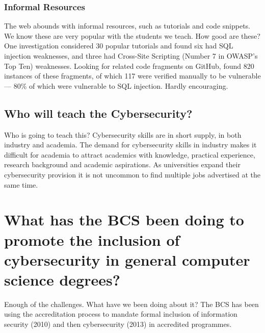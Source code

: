 \documentclass[a4paper,11pt]{article}
\begin{document}
\subsubsection*{Informal Resources}\label{sec:informal}
The web abounds with informal resources, such as tutorials and code snippets. We know these are very popular with the students we teach. How good are these? One investigation \cite{Unruhetal2017a} considered 30 popular tutorials and found six had SQL injection weaknesses, and three had Cross-Site Scripting (Number 7 in OWASP's Top Ten) weaknesses. Looking for related code fragments on GitHub, found 820 instances of these fragments, of which 117 were verified manually to be vulnerable --- 80\% of which were vulnerable to SQL injection. Hardly encouraging.


\subsection*{Who will teach the Cybersecurity?}\label{sec:staffing}
Who is going to teach this? Cybersecurity skills are in short supply, in both industry and academia. The demand for cybersecurity skills in industry makes it difficult for academia to attract academics with knowledge, practical experience, research background and academic aspirations. As universities expand their cybersecurity provision it is not uncommon to find multiple jobs advertised at the same time. 



\section*{What has the BCS been doing to promote the inclusion of cybersecurity in general computer science degrees? }

Enough of the challenges. What have we been doing about it? The BCS has been using the accreditation process to mandate formal inclusion of information security (2010) and then cybersecurity (2013) in accredited programmes. 

\end{document}
